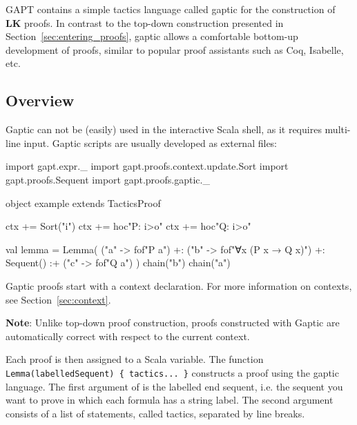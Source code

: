 \documentclass[a4paper,11pt]{book}
\newcommand{\LK}{\textbf{LK}}
\newcommand{\cli}[1]{{\ttfamily {#1}}}
\begin{document}
GAPT contains a simple tactics language called gaptic for the construction of {\LK} proofs.
In contrast to the top-down construction presented in Section~\ref{sec:entering_proofs},
gaptic allows a comfortable bottom-up development of proofs, similar
to popular proof assistants such as Coq, Isabelle, etc.

\subsection{Overview}

Gaptic can not be (easily) used in the interactive Scala shell, as it requires
multi-line input.  Gaptic scripts are usually developed as external files:
\begin{tacticslisting}
  import gapt.expr._
  import gapt.proofs.context.update.Sort
  import gapt.proofs.Sequent
  import gapt.proofs.gaptic._

  object example extends TacticsProof {
      ctx += Sort("i")
      ctx += hoc"P: i>o"
      ctx += hoc"Q: i>o"

      val lemma = Lemma(
      ("a" -> fof"P a") +:
      ("b" -> fof"∀x (P x → Q x)") +:
      Sequent()
      :+ ("c" -> fof"Q a")
      ) {
          chain("b")
          chain("a")
        }
    }
\end{tacticslisting}
\begin{tacticsoutput}
\end{tacticsoutput}

Gaptic proofs start with a context declaration. For more information on
contexts, see Section~\ref{sec:context}.

\textbf{Note}: Unlike top-down proof construction, proofs constructed with Gaptic
are automatically correct with respect to the current context.

Each proof is then assigned to a Scala variable.  The function
\verb,Lemma(labelledSequent) { tactics... }, constructs a proof using the
gaptic language.  The first argument of \cli{Lemma} is the labelled end
sequent, i.e. the sequent you want to prove in which each formula has a string
label.  The second argument consists of a list of statements, called tactics,
separated by line breaks.
\end{document}
